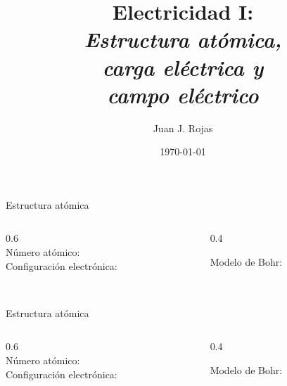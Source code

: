 \documentclass[aspectratio=169]{beamer}
\title[Electricidad I: estructura atómica, carga y campo]{
    Electricidad I:\\
    \emph{Estructura atómica,}\\
    \emph{carga eléctrica y}\\
    \emph{campo eléctrico}
}
\author{
    Juan J. Rojas
}
\institute{Instituto Tecnológico de Costa Rica}
\date{\today}
\begin{document}

{
    \maketitle
}

\setcounter{framenumber}{0}

\begin{frame}{Estructura atómica}
    \begin{columns}[onlytextwidth]
    \begin{column}{0.6\textwidth}
        \alert{}\\[8pt]
        Número atómico: \\[8pt]
        Configuración electrónica:\\[8pt] 
        \\[8pt]  
        \end{column}
    \begin{column}{0.4\textwidth}
    \begin{center}
        Modelo de Bohr:\\[8pt]
    \end{center}
\end{column}
\end{columns}
\end{frame}

\begin{frame}{Estructura atómica}
    \begin{columns}[onlytextwidth]
    \begin{column}{0.6\textwidth}
        \alert{}\\[8pt]
        Número atómico: \\[8pt]
        Configuración electrónica:\\[8pt] 
        \\[8pt]  
        \end{column}
    \begin{column}{0.4\textwidth}
    \begin{center}
        Modelo de Bohr:\\[8pt]
    \end{center}
\end{column}
\end{columns}
\end{frame}
\end{document}
